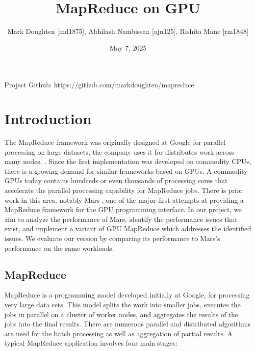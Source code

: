 \documentclass{article}
\title{MapReduce on GPU}
\author{Mark Doughten [md1875], Abhilash Nambissan [ajn125], Rishita Mane [rm1848]}
\date{May 7, 2025}
\begin{document}
\maketitle

Project Github: https://github.com/markdoughten/mapreduce

\section{Introduction}
The MapReduce framework was originally designed at Google for parallel processing on large datasets, the company uses it for distributes work across many nodes. \cite{mapreduce}. Since the first implementation was developed on commodity CPUs, there is a growing demand for similar frameworks based on GPUs. A commodity GPUs today contains hundreds or even thousands of processing cores that accelerate the parallel processing capability for MapReduce jobs. There is prior work in this area, notably Mars \cite{mars}, one of the major first attempts at providing a MapReduce framework for the GPU programming interface. In our project, we aim to analyze the performance of Mars, identify the performance issues that exist, and implement a variant of GPU MapReduce which addresses the identified issues. We evaluate our version by comparing its performance to Mars's performance on the same workloads.

\subsection{MapReduce}
MapReduce is a programming model developed initially at Google, for processing very large data sets. This model splits the work into smaller jobs, executes the jobs in parallel on a cluster of worker nodes, and aggregates the results of the jobs into the final results. There are numerous parallel and distributed algorithms are used for the batch processing as well as aggregation of partial results. A typical MapReduce application involves four main stages:
\end{document}
